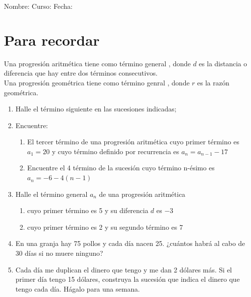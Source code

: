 \documentclass[fleqn]{article}
\newcommand{\LineaNombre}{%
\par
\vspace{\baselineskip}
Nombre:\hrulefill \; Curso: \underline{\hspace*{48pt}} \; Fecha: \underline{\hspace*{2.5cm}} \relax
\par}
\begin{document}
\LineaNombre
\section*{Para recordar}
Una progresi\'on aritmética tiene como término general , donde $d$ es la distancia o diferencia que hay entre dos términos consecutivos.\\

Una progresión geométrica tiene como término genral ,
donde $r$ es la razón geométrica.
\begin{enumerate}
\item Halle el término siguiente en las sucesiones indicadas;
  \begin{enumerate}
\end{enumerate}
\item Encuentre:
  \begin{enumerate}
  \item El tercer término de una progresión aritmética cuyo primer término es $a_1=20$ y cuyo término definido por recurrencia es $a_n=a_{n-1}-17$ \noanswer[.75in]
  \item Encuentre el 4 término de la sucesión cuyo término n-ésimo es $a_n=-6-4(n-1)$ \noanswer[.75in]
  \end{enumerate}
\newpage
\item Halle el término general $a_{n}$ de una progresión aritmética
\begin{enumerate}
\item cuyo primer término es 5 y su diferencia $d$ es $-3$ \noanswer
\item cuyo primer término es 2 y su segundo término es 7 \noanswer
\end{enumerate}
\item En una granja hay 75 pollos y cada día nacen 25. ¿cuántos habrá al cabo de 30 días si no muere ninguno?\noanswer
\item Cada día me duplican el dinero que tengo y me dan 2 dólares más. Si el primer día tengo 15 dólares, construya la sucesión que indica el dinero que tengo cada día. Hágalo para una semana.\noanswer
\end{enumerate}
\end{document}
